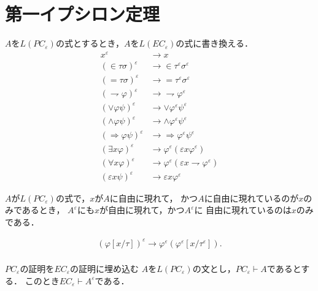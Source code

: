 \section{第一イプシロン定理}
	$A$を$L(PC_{\varepsilon})$の式とするとき，$A$を$L(EC_{\varepsilon})$の式に書き換える．
	\begin{align}
		x^{\varepsilon} &\rightarrow x \\
		(\in \tau \sigma)^{\varepsilon} &\rightarrow \in \tau^{\varepsilon} \sigma^{\varepsilon} \\
		(= \tau \sigma)^{\varepsilon} &\rightarrow = \tau^{\varepsilon} \sigma^{\varepsilon} \\
		(\rightharpoondown \varphi)^{\varepsilon} &\rightarrow \rightharpoondown \varphi^{\varepsilon} \\
		(\vee \varphi \psi)^{\varepsilon} &\rightarrow \vee \varphi^{\varepsilon} \psi^{\varepsilon} \\
		(\wedge \varphi \psi)^{\varepsilon} &\rightarrow \wedge \varphi^{\varepsilon} \psi^{\varepsilon} \\
		(\Longrightarrow \varphi \psi)^{\varepsilon} &\rightarrow \Longrightarrow \varphi^{\varepsilon} \psi^{\varepsilon} \\
		(\exists x \varphi)^{\varepsilon} &\rightarrow \varphi^{\varepsilon}(\varepsilon x \varphi^{\varepsilon}) \\
		(\forall x \varphi)^{\varepsilon} &\rightarrow \varphi^{\varepsilon}(\varepsilon x \rightharpoondown \varphi^{\varepsilon}) \\
		(\varepsilon x \psi)^{\varepsilon} &\rightarrow \varepsilon x \varphi^{\varepsilon}
	\end{align}
	
	$A$が$L(PC_{\varepsilon})$の式で，$x$が$A$に自由に現れて，
	かつ$A$に自由に現れているのが$x$のみであるとき，
	$A^{\varepsilon}$にも$x$が自由に現れて，かつ$A^{\varepsilon}$に
	自由に現れているのは$x$のみである．
	
	\begin{align}
		(\varphi[x/\tau])^{\varepsilon} \rightarrow \varphi^{\varepsilon}
		(\varphi^{\varepsilon}[x/\tau^{\varepsilon}]). \\
	\end{align}
	
	\begin{itembox}[c]{$PC_{\varepsilon}$の証明を$EC_{\varepsilon}$の証明に埋め込む}
		$A$を$L(PC_{\varepsilon})$の文とし，$PC_{\varepsilon} \vdash A$であるとする．
		このとき$EC_{\varepsilon} \vdash A^{\varepsilon}$である．
	\end{itembox}
	
